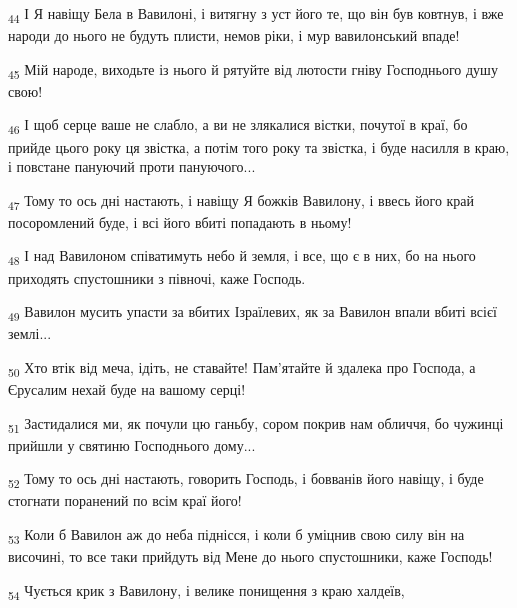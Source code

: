 \begin{tcolorbox}
\textsubscript{44} І Я навіщу Бела в Вавилоні, і витягну з уст його те, що він був ковтнув, і вже народи до нього не будуть плисти, немов ріки, і мур вавилонський впаде!
\end{tcolorbox}
\begin{tcolorbox}
\textsubscript{45} Мій народе, виходьте із нього й рятуйте від лютости гніву Господнього душу свою!
\end{tcolorbox}
\begin{tcolorbox}
\textsubscript{46} І щоб серце ваше не слабло, а ви не злякалися вістки, почутої в краї, бо прийде цього року ця звістка, а потім того року та звістка, і буде насилля в краю, і повстане пануючий проти пануючого...
\end{tcolorbox}
\begin{tcolorbox}
\textsubscript{47} Тому то ось дні настають, і навіщу Я божків Вавилону, і ввесь його край посоромлений буде, і всі його вбиті попадають в ньому!
\end{tcolorbox}
\begin{tcolorbox}
\textsubscript{48} І над Вавилоном співатимуть небо й земля, і все, що є в них, бо на нього приходять спустошники з півночі, каже Господь.
\end{tcolorbox}
\begin{tcolorbox}
\textsubscript{49} Вавилон мусить упасти за вбитих Ізраїлевих, як за Вавилон впали вбиті всієї землі...
\end{tcolorbox}
\begin{tcolorbox}
\textsubscript{50} Хто втік від меча, ідіть, не ставайте! Пам'ятайте й здалека про Господа, а Єрусалим нехай буде на вашому серці!
\end{tcolorbox}
\begin{tcolorbox}
\textsubscript{51} Застидалися ми, як почули цю ганьбу, сором покрив нам обличчя, бо чужинці прийшли у святиню Господнього дому...
\end{tcolorbox}
\begin{tcolorbox}
\textsubscript{52} Тому то ось дні настають, говорить Господь, і бовванів його навіщу, і буде стогнати поранений по всім краї його!
\end{tcolorbox}
\begin{tcolorbox}
\textsubscript{53} Коли б Вавилон аж до неба піднісся, і коли б уміцнив свою силу він на височині, то все таки прийдуть від Мене до нього спустошники, каже Господь!
\end{tcolorbox}
\begin{tcolorbox}
\textsubscript{54} Чується крик з Вавилону, і велике понищення з краю халдеїв,
\end{tcolorbox}
